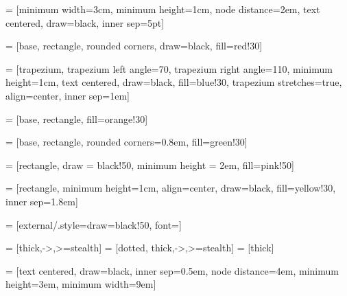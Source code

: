 \usepackage{tikz}
\usepackage{xparse}
\usetikzlibrary{positioning, fit, backgrounds, shapes, arrows.meta}


 = [minimum width=3cm, minimum height=1cm, node distance=2em, text centered, draw=black, inner sep=5pt]

 = [base, rectangle, rounded corners, draw=black, fill=red!30]

 = [trapezium, trapezium left angle=70, trapezium right angle=110, 
 minimum height=1cm, text centered, draw=black, fill=blue!30, trapezium stretches=true,
 align=center, inner sep=1em] 

 = [base, rectangle, fill=orange!30]

 = [base, rectangle, rounded corners=0.8em, fill=green!30]

 = [rectangle, draw = black!50, minimum height = 2em, fill=pink!50]

 = [rectangle, minimum height=1cm, align=center, draw=black, fill=yellow!30, inner sep=1.8em]

 = [external/.style={draw=black!50}, font={\fontsize{13pt}{12}\selectfont}]

 = [thick,->,>=stealth]
 = [dotted, thick,->,>=stealth]
 = [thick]

\NewDocumentCommand{}
\newcommand\insertitem[1]{\item #1}

\NewDocumentCommand{}

\newcommand{\shortarrowlength}{3.1em}

 = [text centered, draw=black, inner sep=0.5em, node
distance=4em, minimum height=3em, minimum width=9em]

